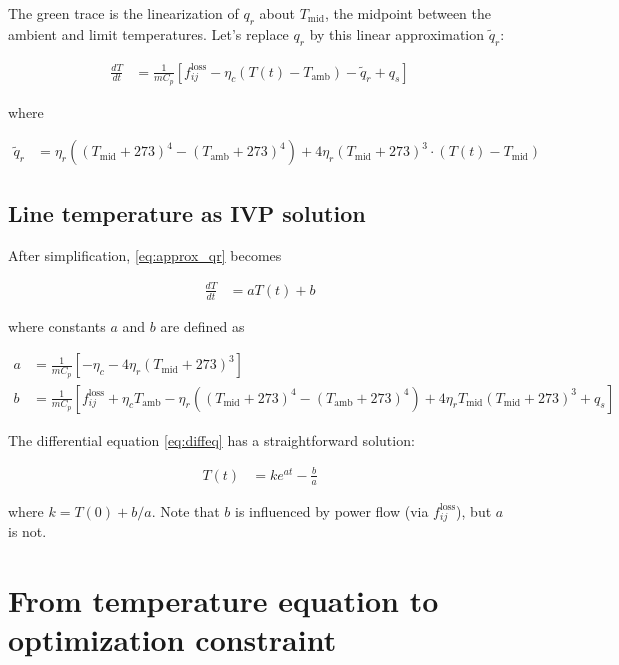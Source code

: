 \documentclass[conference]{IEEEtran}
\begin{document}
The green trace is the linearization of $q_r$ about $T_\text{mid}$, the midpoint between the ambient and limit temperatures. Let's replace $q_r$ by this linear approximation $\tilde{q}_r$:

\begin{align}\label{eq:approx_qr}
\frac{dT}{dt} &= \frac{1}{mC_p}\left[ f_{ij}^\text{loss} - \eta_c\left( T(t) - T_\text{amb}\right) - \tilde{q}_r + q_s \right]
\end{align}

where

\begin{align}
\tilde{q}_r &= \eta_r  \left( (T_\text{mid} + 273)^4 - (T_\text{amb} + 273)^4\right) + 4\eta_r(T_\text{mid} + 273)^3\cdot(T(t) - T_\text{mid})
\end{align}


\subsection{Line temperature as IVP solution}
After simplification, \eqref{eq:approx_qr} becomes

\begin{align}\label{eq:diffeq}
\frac{dT}{dt} &= aT(t) + b
\end{align}

where constants $a$ and $b$ are defined as

\begin{subequations}
\begin{align}
a &= \frac{1}{mC_p} \left[ -\eta_c - 4\eta_r(T_\text{mid} + 273)^3 \right] \\
b &= \frac{1}{mC_p} \left[ f_{ij}^\text{loss} + \eta_cT_\text{amb} - \eta_r \left( (T_\text{mid} + 273)^4 - (T_\text{amb} + 273)^4 \right) + 4\eta_rT_\text{mid}(T_\text{mid} + 273)^3 + q_s \right]
\end{align}
\end{subequations}

The differential equation \eqref{eq:diffeq} has a straightforward solution:

\begin{align}\label{eq:tivp}
T(t) &= ke^{at} - \frac{b}{a}
\end{align}

where $k=T(0) + b/a$. Note that $b$ is influenced by power flow (via
$f_{ij}^\text{loss}$), but $a$ is not.    

\section{From temperature equation to optimization constraint}\label{from-ivp-to-optimization-constraint}
\end{document}
